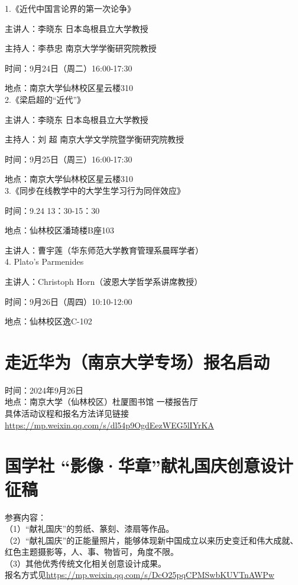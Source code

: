 \documentclass[letterpaper, 12pt]{article}
\begin{document}
\begin{multicols}{2}
1.《近代中国言论界的第一次论争》

主讲人：李晓东 日本岛根县立大学教授

主持人：李恭忠 南京大学学衡研究院教授

时间：9月24日（周二）16:00-17:30

地点：南京大学仙林校区星云楼310\\





2.《梁启超的“近代”》

主讲人：李晓东 日本岛根县立大学教授

主持人：刘  超 南京大学文学院暨学衡研究院教授

时间：9月25日（周三）16:00-17:30

地点：南京大学仙林校区星云楼310\\

3.《同步在线教学中的大学生学习行为同伴效应》

时间：9.24 13：30-15：30

地点：仙林校区潘琦楼B座103

主讲人：曹宇莲（华东师范大学教育管理系晨晖学者）\\

4. Plato's Parmenides

主讲人：Christoph Horn（波恩大学哲学系讲席教授）

时间：9月26日（周四）10:10-12:00

地点：仙林校区逸C-102
\section{走近华为（南京大学专场）报名启动}
时间：2024年9月26日\\
地点：南京大学（仙林校区）杜厦图书馆 一楼报告厅\\
具体活动议程和报名方法详见链接\url{https://mp.weixin.qq.com/s/dl54p9OgdEezWEG5lIYrKA}
\section{国学社 “影像·华章”献礼国庆创意设计征稿}
参赛内容：\\
（1）“献礼国庆”的剪纸、篆刻、漆扇等作品。\\
（2）“献礼国庆”的正能量照片，能够体现新中国成立以来历史变迁和伟大成就、红色主题摄影等，人、事、物皆可，角度不限。\\
（3）其他优秀传统文化相关创意设计成果。\\
报名方式见\url{https://mp.weixin.qq.com/s/DcO25pqCPMSwbKUVTnAWPw}

\end{multicols}
\end{document}
